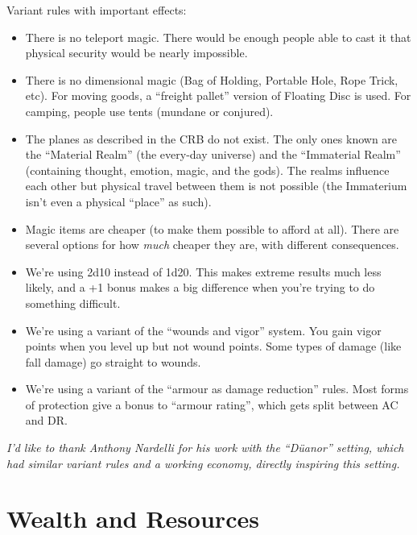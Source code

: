 Variant rules with important effects:
\begin{itemize}
%
\item There is no teleport magic. There would be enough people able to cast
it that physical security would be nearly impossible.
%
\item There is no dimensional magic (Bag of Holding, Portable Hole, Rope
Trick, etc). For moving goods, a ``freight pallet'' version of Floating Disc
is used. For camping, people use tents (mundane or conjured).
%
\item The planes as described in the CRB do not exist. The only ones known
are the ``Material Realm'' (the every-day universe) and the ``Immaterial
Realm'' (containing thought, emotion, magic, and the gods). The realms
influence each other but physical travel between them is not possible (the
Immaterium isn't even a physical ``place'' as such).
%
\item Magic items are cheaper (to make them possible to afford at all). There
are several options for how \textit{much} cheaper they are, with different
consequences.
%
\item We're using 2d10 instead of 1d20. This makes extreme results much less
likely, and a +1 bonus makes a big difference when you're trying to do
something difficult.
%
\item We're using a variant of the ``wounds and vigor'' system. You gain
vigor points when you level up but not wound points. Some types of damage
(like fall damage) go straight to wounds.
%
\item We're using a variant of the ``armour as damage reduction'' rules. Most
forms of protection give a bonus to ``armour rating'', which gets split
between AC and DR.
%
\end{itemize}
%
\textit{I'd like to thank Anthony Nardelli for his work with the ``D\"{u}anor''
setting, which had similar variant rules and a working economy, directly
inspiring this setting.}

%
%
%
\section{Wealth and Resources}
\label{sect-over-econ}


